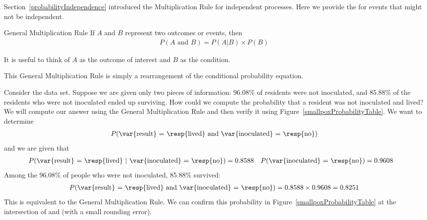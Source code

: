 Section~\ref{probabilityIndependence} introduced the Multiplication Rule for independent processes. Here we provide the  for events that might not be independent.

\begin{onebox}{General Multiplication Rule}
If $A$ and $B$ represent two outcomes or events, then \vspace{-1.5mm}
\begin{align*}
P(A\text{ and }B) = P(A | B)\times P(B)
\end{align*} \vspace{-6.5mm} \par
It is useful to think of $A$ as the outcome of interest and $B$ as the condition.
\end{onebox}

\noindent%
This General Multiplication Rule is simply a rearrangement of the conditional probability equation.


\begin{examplewrap}
\begin{nexample}{Consider the  data set. Suppose we are given only two pieces of information: 96.08\% of residents were not inoculated, and 85.88\% of the residents who were not inoculated ended up surviving. How could we compute the probability that a resident was not inoculated and lived?}
We will compute our answer using the General Multiplication Rule and then verify it using Figure~\ref{smallpoxProbabilityTable}. We want to determine
\begin{align*}
P(\text{\var{result}
    = \resp{lived} and \var{inoculated} = \resp{no}})
\end{align*}
and we are given that
\begin{align*}
P(\text{\var{result}
    = \resp{lived} }|\text{ \var{inoculated} = \resp{no}})
    &= 0.8588 %
&&P(\text{\var{inoculated} = \resp{no}})
    = 0.9608
\end{align*}
Among the 96.08\% of people who were not inoculated, 85.88\% survived:
\begin{align*}
P(\text{\var{result} = \resp{lived}
        and \var{inoculated} = \resp{no}})
    = 0.8588 \times 0.9608
    = 0.8251
\end{align*}
This is equivalent to the General Multiplication Rule. We can confirm this probability in Figure~\ref{smallpoxProbabilityTable} at the intersection of  and  (with a small rounding error).
\end{nexample}
\end{examplewrap}

